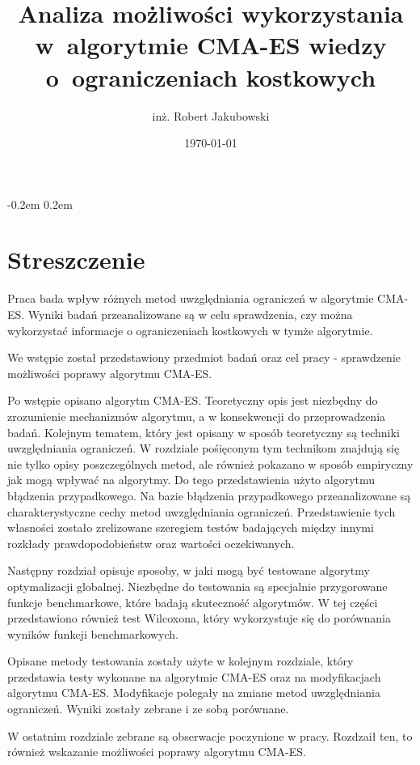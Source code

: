 \documentclass{mini}
\title{Analiza możliwości wykorzystania w~algorytmie CMA-ES wiedzy o~ograniczeniach kostkowych}
\author{inż. Robert Jakubowski}
\date{\today}
\begin{document}
\maketitle

\pagebreak
\thispagestyle{empty}

\openup -0.2em %
\tableofcontents
\openup 0.2em %

\thispagestyle{empty}
\raggedbottom
\pagebreak


\section{Streszczenie}

Praca bada wpływ różnych metod uwzględniania ograniczeń w algorytmie CMA-ES. Wyniki badań przeanalizowane są w celu sprawdzenia, czy można wykorzystać informacje o ograniczeniach kostkowych w tymże algorytmie.

We wstępie został przedstawiony przedmiot badań oraz cel pracy - sprawdzenie możliwości poprawy algorytmu CMA-ES.

Po wstępie opisano algorytm CMA-ES. Teoretyczny opis jest niezbędny do zrozumienie mechanizmów algorytmu, a w konsekwencji do przeprowadzenia badań. Kolejnym tematem, który jest opisany w sposób teoretyczny są techniki uwzględniania ograniczeń. W rozdziale pośięconym tym technikom znajdują się nie tylko opisy poszczególnych metod, ale również pokazano w sposób empiryczny jak mogą wpływać na algorytmy. Do tego przedstawienia użyto algorytmu błądzenia przypadkowego. Na bazie błądzenia przypadkowego przeanalizowane są charakterystyczne cechy metod uwzględniania ograniczeń. Przedstawienie tych własności zostało zrelizowane szeregiem testów badających między innymi rozkłady prawdopodobieństw oraz wartości oczekiwanych.

Następny rozdział opisuje sposoby, w jaki mogą być testowane algorytmy optymalizacji globalnej. Niezbędne do testowania są specjalnie przygorowane funkcje benchmarkowe, które badają skuteczność algorytmów. W tej części przedstawiono również test Wilcoxona, który wykorzystuje się do porównania wyników funkcji benchmarkowych.

Opisane metody testowania zostały użyte w kolejnym rozdziale, który przedstawia testy wykonane na algorytmie CMA-ES oraz na modyfikacjach algorytmu CMA-ES. Modyfikacje polegały na zmiane metod uwzględniania ograniczeń. Wyniki zostały zebrane i ze sobą porównane.

W ostatnim rozdziale zebrane są obserwacje poczynione w pracy. Rozdzaił ten, to również wskazanie możliwości poprawy algorytmu CMA-ES.
\end{document}
